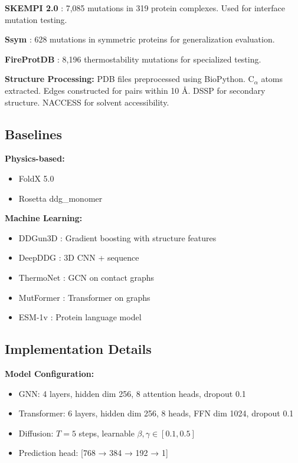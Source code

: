\documentclass[12pt,en]{elegantpaper}
\begin{document}
\textbf{SKEMPI 2.0} \citep{jankauskaite2019skempi}: 7,085 mutations in 319 protein complexes. Used for interface mutation testing.

\textbf{Ssym} \citep{kellogg2011role}: 628 mutations in symmetric proteins for generalization evaluation.

\textbf{FireProtDB} \citep{musil2017fireprotdb}: 8,196 thermostability mutations for specialized testing.

\textbf{Structure Processing:} PDB files preprocessed using BioPython. C$_\alpha$ atoms extracted. Edges constructed for pairs within 10 Å. DSSP \citep{kabsch1983dssp} for secondary structure. NACCESS for solvent accessibility.

\subsection{Baselines}

\textbf{Physics-based:}
\begin{itemize}
    \item FoldX 5.0 \citep{schymkowitz2005foldx}
    \item Rosetta ddg\_monomer \citep{kellogg2011role}
\end{itemize}

\textbf{Machine Learning:}
\begin{itemize}
    \item DDGun3D \citep{montanucci2022ddgun}: Gradient boosting with structure features
    \item DeepDDG \citep{cao2019deepddg}: 3D CNN + sequence
    \item ThermoNet \citep{li2020predicting}: GCN on contact graphs
    \item MutFormer \citep{zhou2020mutation}: Transformer on graphs
    \item ESM-1v \citep{meier2021language}: Protein language model
\end{itemize}

\subsection{Implementation Details}

\textbf{Model Configuration:}
\begin{itemize}
    \item GNN: 4 layers, hidden dim 256, 8 attention heads, dropout 0.1
    \item Transformer: 6 layers, hidden dim 256, 8 heads, FFN dim 1024, dropout 0.1
    \item Diffusion: $T=5$ steps, learnable $\beta, \gamma \in [0.1, 0.5]$
    \item Prediction head: [768 → 384 → 192 → 1]
\end{itemize}
\end{document}
